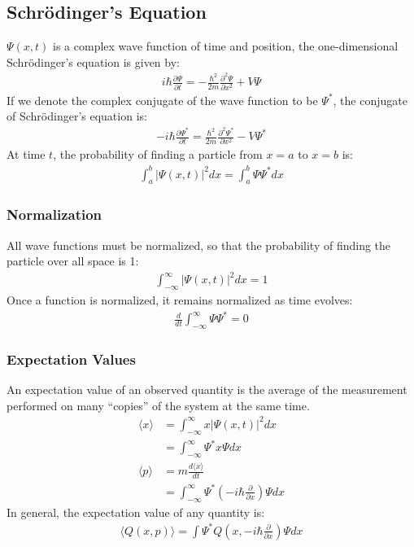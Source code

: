 \documentclass[11pt]{article}
\newcommand{\cc}[1]{
  \ensuremath{#1^{\ast}}}               %
\newcommand{\pd}[2]{
  \ensuremath{
    \frac{\partial #1}{\partial #2} }} %
\begin{document}
\begin{multicols*}{3}
\subsection{Schr\"{o}dinger's Equation}
$\Psi(x, t)$ is a complex wave function of time and position, the one-dimensional Schr\"{o}dinger's equation is given by:
\begin{align*}
  i \hbar \pd{\Psi}{t} = - \frac{\hbar^2}{2m} \pd{^2 \Psi}{x^2} + V\Psi
\end{align*}
If we denote the complex conjugate of the wave function to be $\cc{\Psi}$, the conjugate of Schr\"{o}dinger's equation is:
\begin{align*}
  -i \hbar \pd{\cc{\Psi}}{t} = \frac{\hbar^2}{2m} \pd{^2 \cc{\Psi}}{x^2} - V\cc{\Psi}
\end{align*}
At time $t$, the probability of finding a particle from $x=a$ to $x=b$ is:
\begin{align*}
  \int_{a}^{b} |\Psi(x, t)|^2 dx = \int_{a}^{b}\Psi\cc{\Psi}dx
\end{align*}
\subsubsection{Normalization}
All wave functions must be normalized, so that the probability of finding the particle over all space is 1:
\begin{align*}
  \int_{-\infty}^{\infty} |\Psi(x,t)|^2 dx = 1
\end{align*}
Once a function is normalized, it remains normalized as time evolves:
\begin{align*}
  \frac{d}{dt} \int_{-\infty}^{\infty} \Psi \cc{\Psi} = 0
\end{align*}
\subsubsection{Expectation Values}
An expectation value of an observed quantity is the average of the measurement performed on many ``copies'' of the system at the same time.
\begin{align*}
  \langle x\rangle &= \int_{-\infty}^{\infty} x |\Psi(x,t)|^2 dx \\
  &= \int_{-\infty}^{\infty} \cc{\Psi} x \Psi dx \\
  \langle p\rangle &= m\frac{d\langle x\rangle}{dt} \\
  &= \int_{-\infty}^{\infty} \cc{\Psi} \left( -i\hbar \pd{}{x} \right) \Psi dx
\end{align*}
In general, the expectation value of any quantity is:
\begin{align*}
  \langle Q(x, p) \rangle = \int \cc{\Psi} Q\left(x, -i\hbar\pd{}{x} \right) \Psi dx
\end{align*}


\end{multicols*}
\end{document}
